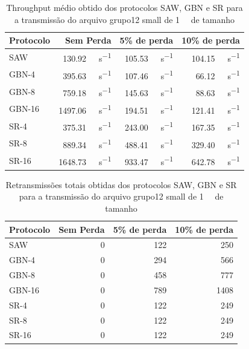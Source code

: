 \documentclass[11pt,a4paper]{article}
\begin{document}
\begin{table}[H]
\begin{center}
\begin{tabular}{@{}lrrr@{}}
\toprule
	\textbf{Protocolo} & \textbf{Sem Perda} & \textbf{5\% de perda} & \textbf{10\% de perda} \\
\midrule

	SAW    & \SI{130.92}{\kilo\bit\per\second}  & \SI{105.53}{\kilo\bit\per\second} & \SI{104.15}{\kilo\bit\per\second} \\
	GBN-4  & \SI{395.63}{\kilo\bit\per\second}  & \SI{107.46}{\kilo\bit\per\second} & \SI{66.12}{\kilo\bit\per\second} \\
	GBN-8  & \SI{759.18}{\kilo\bit\per\second}  & \SI{145.63}{\kilo\bit\per\second} & \SI{88.63}{\kilo\bit\per\second} \\
	GBN-16 & \SI{1497.06}{\kilo\bit\per\second} & \SI{194.51}{\kilo\bit\per\second} & \SI{121.41}{\kilo\bit\per\second} \\
	SR-4   & \SI{375.31}{\kilo\bit\per\second}  & \SI{243.00}{\kilo\bit\per\second} & \SI{167.35}{\kilo\bit\per\second} \\
	SR-8   & \SI{889.34}{\kilo\bit\per\second}  & \SI{488.41}{\kilo\bit\per\second} & \SI{329.40}{\kilo\bit\per\second} \\
	SR-16  & \SI{1648.73}{\kilo\bit\per\second} & \SI{933.47}{\kilo\bit\per\second} & \SI{642.78}{\kilo\bit\per\second} \\

\bottomrule
\end{tabular}
\end{center}
	\caption{Throughput médio obtido dos protocolos SAW, GBN e SR para a transmissão do arquivo grupo12 small de \SI{1}{\mebi\byte} de tamanho}
	\label{tab:throughput}
\end{table}

\begin{table}[H]
\begin{center}
\begin{tabular}{@{}lrrr@{}}
\toprule
	\textbf{Protocolo} & \textbf{Sem Perda} & \textbf{5\% de perda} & \textbf{10\% de perda} \\
\midrule

	SAW    & 0 & 122 & 250 \\
	GBN-4  & 0 & 294 & 566 \\
	GBN-8  & 0 & 458 & 777 \\
	GBN-16 & 0 & 789 & 1408 \\
	SR-4   & 0 & 122 & 249 \\
	SR-8   & 0 & 122 & 249 \\
	SR-16  & 0 & 122 & 249 \\

\bottomrule
\end{tabular}
\end{center}
	\caption{Retransmissões totais obtidas dos protocolos SAW, GBN e SR para a transmissão do arquivo grupo12 small de \SI{1}{\mebi\byte} de tamanho}
	\label{tab:retransmissoes}
\end{table}
\end{document}
